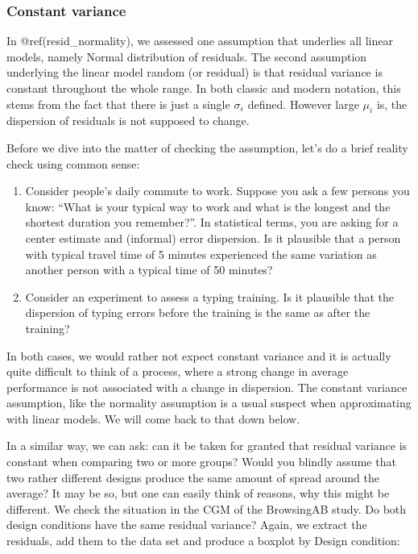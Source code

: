 \documentclass[]{svmono}
\begin{document}
\subsubsection{Constant variance}\label{resid_constant_variance}

In @ref(resid\_normality), we assessed one assumption that underlies all
linear models, namely Normal distribution of residuals. The second
assumption underlying the linear model random (or residual) is that
residual variance is constant throughout the whole range. In both
classic and modern notation, this stems from the fact that there is just
a single \(\sigma_\epsilon\) defined. However large \(\mu_i\) is, the
dispersion of residuals is not supposed to change.

Before we dive into the matter of checking the assumption, let's do a
brief reality check using common sense:

\begin{enumerate}
\def\labelenumi{\arabic{enumi}.}
\item
  Consider people's daily commute to work. Suppose you ask a few persons
  you know: ``What is your typical way to work and what is the longest
  and the shortest duration you remember?''. In statistical terms, you
  are asking for a center estimate and (informal) error dispersion. Is
  it plausible that a person with typical travel time of 5 minutes
  experienced the same variation as another person with a typical time
  of 50 minutes?
\item
  Consider an experiment to assess a typing training. Is it plausible
  that the dispersion of typing errors before the training is the same
  as after the training?
\end{enumerate}

In both cases, we would rather not expect constant variance and it is
actually quite difficult to think of a process, where a strong change in
average performance is not associated with a change in dispersion. The
constant variance assumption, like the normality assumption is a usual
suspect when approximating with linear models. We will come back to that
down below.

In a similar way, we can ask: can it be taken for granted that residual
variance is constant when comparing two or more groups? Would you
blindly assume that two rather different designs produce the same amount
of spread around the average? It may be so, but one can easily think of
reasons, why this might be different. We check the situation in the CGM
of the BrowsingAB study. Do both design conditions have the same
residual variance? Again, we extract the residuals, add them to the data
set and produce a boxplot by Design condition:
\end{document}
